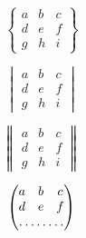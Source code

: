 \documentclass[12pt,a4paper]{report}
\numberwithin{equation}{section}
\begin{document}
$$
\begin{Bmatrix}
a & b & c \\
d & e & f \\
g & h & i
\end{Bmatrix}
$$

$$
\begin{vmatrix}
a & b & c \\
d & e & f \\
g & h & i
\end{vmatrix}
$$

$$
\begin{Vmatrix}
a & b & c \\
d & e & f \\
g & h & i
\end{Vmatrix}
$$%

$$
\begin{pmatrix}
a & b & c \\
d & e & f \\
\hdotsfor{3}
\end{pmatrix}
$$
\end{document}

